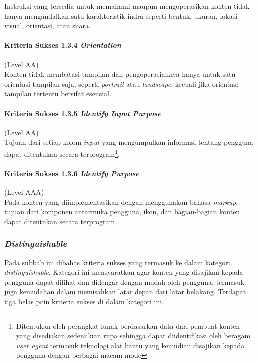Instruksi yang tersedia untuk memahami maupun mengoperasikan konten tidak hanya mengandalkan satu karakteristik indra seperti bentuk, ukuran, lokasi visual, orientasi, atau suara.

\paragraph{Kriteria Sukses 1.3.4 \textit{Orientation}}
\label{sec:kriteria_sukses_1.3.4}
(Level AA)\\

Konten tidak membatasi tampilan dan pengoperasiannya hanya untuk satu orientasi tampilan saja, seperti \textit{portrait} atau \textit{landscape}, kecuali jika orientasi tampilan tertentu bersifat esensial.

\paragraph{Kriteria Sukses 1.3.5 \textit{Identify Input Purpose}}
\label{sec:kriteria_sukses_1.3.5}
(Level AA)\\

Tujuan dari setiap kolom \textit{input} yang mengumpulkan informasi tentang pengguna dapat ditentukan secara terprogram\footnote{Ditentukan oleh perangkat lunak berdasarkan data dari pembuat konten yang disediakan sedemikian rupa sehingga dapat diidentifikasi oleh beragam \textit{user agent} termasuk teknologi alat bantu yang kemudian disajikan kepada pengguna dengan berbagai macam mode}.

\paragraph{Kriteria Sukses 1.3.6 \textit{Identify Purpose}}
\label{sec:kriteria_sukses_1.3.6}
(Level AAA)\\

Pada konten yang diimplementasikan dengan menggunakan bahasa \textit{markup}, tujuan dari komponen antarmuka pengguna, ikon, dan bagian-bagian konten dapat ditentukan secara terprogram.

\subsubsection{\textit{Distinguishable}}
\label{sec:distinguishable}
Pada subbab ini dibahas kriteria sukses yang termasuk ke dalam kategori \textit{distinguishable}. Kategori ini mensyaratkan agar konten yang disajikan kepada pengguna dapat dilihat dan didengar dengan mudah oleh pengguna, termasuk juga kemudahan dalam memisahkan latar depan dari latar belakang. Terdapat tiga belas poin kriteria sukses di dalam kategori ini.

